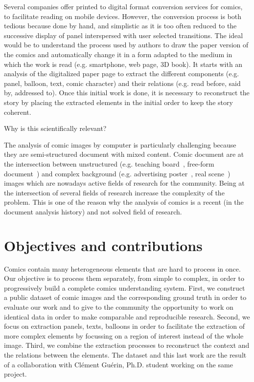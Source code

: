 Several companies offer printed to digital format conversion services for comics, to facilitate reading on mobile devices.
However, the conversion process is both tedious because done by hand, and simplistic as it is too often reduced to the successive display of panel interspersed with user selected transitions.
The ideal would be to understand the process used by authors to draw the paper version of the comics and automatically change it in a form adapted to the medium in which the work is read (e.g. smartphone, web page, 3D book). 
It starts with an analysis of  the digitalized paper page to extract the different components (e.g. panel, balloon, text, comic character) and their relations (e.g. read before, said by, addressed to).
Once this initial work is done, it is necessary to reconstruct the story by placing the extracted elements in the initial order to keep the story coherent.



Why is this scientifically relevant?

The analysis of comic images by computer is particularly challenging because they are semi-structured document with mixed content.
Comic document are at the intersection between unstructured (e.g. teaching board~\cite{Oliveira10}, free-form document~\cite{Delaye2014Multi}) and complex background (e.g. advertising poster~\cite{Clavelli09}, real scene~\cite{Weinman09,Epshtein10,Neumann12}) images which are nowadays active fields of research for the community.
Being at the intersection of several fields of research increase the complexity of the problem.
This is one of the reason why the analysis of comics is a recent (in the document analysis history) and not solved field of research.



\section{Objectives and contributions}
Comics contain many heterogeneous elements that are hard to process in once.
Our objective is to process them separately, from simple to complex, in order to progressively build a complete comics understanding system.
First, we construct a public dataset of comic images and the corresponding ground truth in order to evaluate our work and to give to the community the opportunity to work on identical data in order to make comparable and reproducible research.
Second, we focus on extraction panels, texts, balloons in order to facilitate the extraction of more complex elements by focussing on a region of interest instead of the whole image.
Third, we combine the extraction processes to reconstruct the context and the relations between the elements.
The dataset and this last work are the result of a collaboration with Cl{\'e}ment Gu{\'e}rin, Ph.D. student working on the same project.

